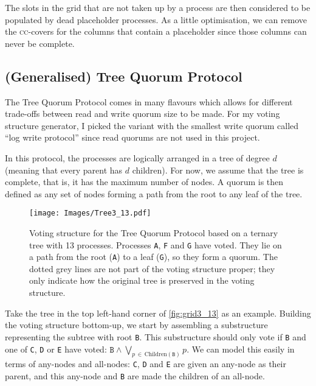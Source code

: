 \documentclass[draft,11pt,chapterprefix=true,toc=bibliography,numbers=noendperiod,
               footnotes=multiple,twoside]{scrreprt}
\begin{document}
The slots in the grid that are not taken up by a process are then considered to be populated by dead placeholder processes. As a little optimisation, we can remove the \textsc{cc}-covers for the columns that contain a placeholder since those columns can never be complete.

\subsection{(Generalised) Tree Quorum Protocol}

The Tree Quorum Protocol \autocite{tree} comes in many flavours which allows for different trade-offs between read and write quorum size to be made. For my voting structure generator, I picked the variant with the smallest write quorum called \enquote{log write protocol} since read quorums are not used in this project.

In this protocol, the processes are logically arranged in a tree of degree \(d\) (meaning that every parent has \(d\) children). For now, we assume that the tree is complete, that is, it has the maximum number of nodes. A quorum is then defined as any set of nodes forming a path from the root to any leaf of the tree.

\begin{figure}[h]
    \centering
    \texttt{[image: Images/Tree3\_13.pdf]}
    \caption{Voting structure for the Tree Quorum Protocol based on a ternary tree with 13 processes. Processes \texttt{A}, \texttt{F} and \texttt{G} have voted. They lie on a path from the root (\texttt{A}) to a leaf (\texttt{G}), so they form a quorum. The dotted grey lines are not part of the voting structure proper; they only indicate how the original tree is preserved in the voting structure.}
    \label{fig:grid3_13}
\end{figure}

Take the tree in the top left-hand corner of \autoref{fig:grid3_13} as an example. Building the voting structure bottom-up, we start by assembling a substructure representing the subtree with root \texttt{B}. This substructure should only vote if \texttt{B} and one of \texttt{C}, \texttt{D} or \texttt{E} have voted: \( \texttt{B} \wedge \bigvee_{p\,\in\,\text{Children}(\texttt{B})} p \). We can model this easily in terms of any-nodes and all-nodes: \texttt{C}, \texttt{D} and \texttt{E} are given an any-node as their parent, and this any-node and \texttt{B} are made the children of an all-node.
\end{document}
